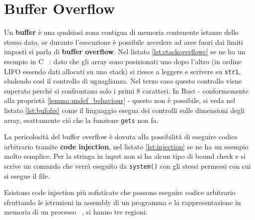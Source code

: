 \documentclass[Lau,binding=0.6cm]{sapthesis}
\newcommand{\textcode}[1]{\colorbox{backcolour}{\texttt{#1}}}
\begin{document}
\section{Buffer Overflow} \label{sec:buffer_overflow}
Un \textbf{buffer} è una qualsiasi zona contigua di memoria contenente istanze dello stesso dato, se durante l'esecuzione è possibile accedere ad aree fuori dai limiti imposti si parla di \textbf{buffer overflow}.
Nel listato \ref{lst:stackoverflowc} se ne ha un esempio in C ~\cite[7.5]{stallings:os}: dato che gli array sono posizionati uno dopo l'altro (in ordine LIFO essendo dati allocati su uno stack) si riesce a leggere e scrivere su \textcode{str1}, eludendo così il controllo di uguaglianza.
Nel terzo caso questo controllo viene superato perché si confrontano solo i primi 8 caratteri.
In Rust - conformemente alla proprietà \ref{lemma:undef_behaviour} - questo non è possibile, si veda nel listato \ref{lst:bufofrs} come il linguaggio esegua dei controlli sulle dimensioni degli array, esattamente ciò che la funzione \textcode{gets} non fa. 









La pericolosità del buffer overflow è dovuta alla possibilità di eseguire codice arbitrario tramite \textbf{code injection}, nel listato \ref{lst:injection} se ne ha un esempio molto semplice. 
Per la stringa in input non si ha alcun tipo di bound check e si scrive un comando che verrà eseguito da \textcode{system()} con gli stessi permessi con cui si esegue il file. 




Esistono code injection più sofisticate che possono eseguire codice arbitrario sfruttando le istruzioni in assembly di un programma e la rappresentazione in memoria di un processo ~\cite{stack_smashing_ffp}, si hanno tre regioni:
\end{document}
